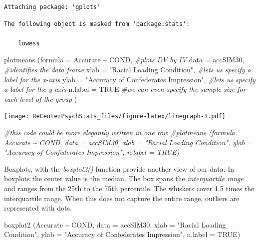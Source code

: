 \documentclass[
  english,
]{book}
\newenvironment{Shaded}{\begin{snugshade}}{\end{snugshade}}
\newcommand{\AttributeTok}[1]{\textcolor[rgb]{0.77,0.63,0.00}{#1}}
\newcommand{\CommentTok}[1]{\textcolor[rgb]{0.56,0.35,0.01}{\textit{#1}}}
\newcommand{\ConstantTok}[1]{\textcolor[rgb]{0.00,0.00,0.00}{#1}}
\newcommand{\FunctionTok}[1]{\textcolor[rgb]{0.00,0.00,0.00}{#1}}
\newcommand{\NormalTok}[1]{#1}
\newcommand{\SpecialCharTok}[1]{\textcolor[rgb]{0.00,0.00,0.00}{#1}}
\newcommand{\StringTok}[1]{\textcolor[rgb]{0.31,0.60,0.02}{#1}}
\begin{document}
\begin{verbatim}
Attaching package: 'gplots'
\end{verbatim}

\begin{verbatim}
The following object is masked from 'package:stats':

    lowess
\end{verbatim}

\begin{Shaded}
\begin{Highlighting}[]
\FunctionTok{plotmeans}\NormalTok{ (}\AttributeTok{formula =}\NormalTok{ Accurate }\SpecialCharTok{\textasciitilde{}}\NormalTok{ COND, }\CommentTok{\#plots DV by IV}
           \AttributeTok{data =}\NormalTok{ accSIM30, }\CommentTok{\#identifies the data frame}
           \AttributeTok{xlab =} \StringTok{"Racial Loading Condition"}\NormalTok{, }\CommentTok{\#let\textquotesingle{}s us specify a label for the x{-}axis}
           \AttributeTok{ylab =} \StringTok{"Accuracy of Confederate\textquotesingle{}s Impression"}\NormalTok{, }\CommentTok{\#let\textquotesingle{}s us specify a label for the y{-}axis}
           \AttributeTok{n.label =} \ConstantTok{TRUE}  \CommentTok{\#we can even specify the sample size for each level of the group}
\NormalTok{           )}
\end{Highlighting}
\end{Shaded}

\texttt{[image: ReCenterPsychStats\_files/figure-latex/linegraph-1.pdf]}

\begin{Shaded}
\begin{Highlighting}[]
\CommentTok{\#this code could be more elegantly written in one row}
\CommentTok{\#plotmeans (formula = Accurate \textasciitilde{} COND, data = accSIM30, xlab = "Racial Loading Condition", ylab = "Accuracy of Confederate\textquotesingle{}s Impression", n.label = TRUE)}
\end{Highlighting}
\end{Shaded}

Boxplots, with the \emph{boxplot2()} function provide another view of our data. In boxplots the center value is the median. The box spans the \emph{interquartile range} and ranges from the 25th to the 75th percentile. The whiskers cover 1.5 times the interquartile range. When this does not capture the entire range, outliers are represented with dots.

\begin{Shaded}
\begin{Highlighting}[]
\FunctionTok{boxplot2}\NormalTok{ (Accurate }\SpecialCharTok{\textasciitilde{}}\NormalTok{ COND, }\AttributeTok{data =}\NormalTok{ accSIM30, }\AttributeTok{xlab =} \StringTok{"Racial Loading Condition"}\NormalTok{, }\AttributeTok{ylab =} \StringTok{"Accuracy of Confederate\textquotesingle{}s Impression"}\NormalTok{, }\AttributeTok{n.label =} \ConstantTok{TRUE}\NormalTok{)}
\end{Highlighting}
\end{Shaded}
\end{document}
